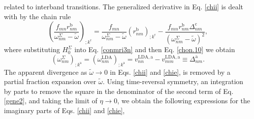 related to interband transitions. The generalized derivative in Eq. \eqref{chii}
is dealt with by the chain rule
\begin{equation}
\left(\frac{f_{mn}r_{nm}^{\mathrm{b}}}
{\omega^\Sigma_{nm}-\tilde\omega}\right)_{;k^{\mathrm{c}}}=
\frac{f_{mn}}{\omega^\Sigma_{nm}-\tilde\omega}
\left(r_{nm}^\mathrm{b}\right)_{;k^{\mathrm{c}}}
-\frac{f_{mn}r_{nm}^{\mathrm{b}}\Delta_{nm}^\mathrm{c}}
{(\omega^\Sigma_{nm}-\tilde\omega)^2},
\label{gene2}
\end{equation}
where substituting $H^\Sigma_0$ into Eq. \eqref{conmri3n} and then Eq.
\eqref{chon.10} we obtain
\begin{equation}\label{eli.13}
\left(\omega^\Sigma_{nm}\right)_{;k^{\mathrm{a}}}
= \left(\omega^\mathrm{LDA}_{nm}\right)_{;k^{\mathrm{a}}}
= v_{nn}^{\mathrm{LDA},\mathrm{a}}
- v_{mm}^{\mathrm{LDA},\mathrm{a}}\equiv\Delta_{nm}^{\mathrm{a}}.
\end{equation} 
The apparent divergence as $\tilde\omega\to 0$ in Eqs. \eqref{chii} and
\eqref{chie}, is removed  by a partial fraction expansion over $\tilde\omega$.
Using time-reversal symmetry, an integration by parts to remove the square in
the denominator of the second term of Eq. \eqref{gene2}, and taking the limit of
$\eta\to 0$, we obtain the following expressions for the imaginary parts of Eqs.
\eqref{chii} and \eqref{chie},
